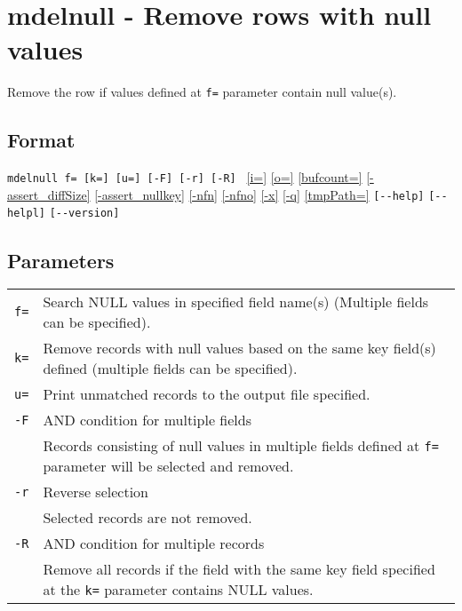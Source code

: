%

\section{mdelnull - Remove rows with null values\label{sect:mdelnull}}
Remove the row if values defined at \verb|f=| parameter contain null value(s). \\

\subsection*{Format}
\verb|mdelnull f= [k=] [u=] [-F] [-r] [-R] | 
\hyperref[sect:option_i]{[i=]}
\hyperref[sect:option_o]{[o=]}
\hyperref[sect:option_bufcount]{[bufcount=]} 
\hyperref[sect:option_assert_diffSize]{[-assert\_diffSize]}
\hyperref[sect:option_assert_nullkey]{[-assert\_nullkey]}
\hyperref[sect:option_nfn]{[-nfn]} 
\hyperref[sect:option_nfno]{[-nfno]}  
\hyperref[sect:option_x]{[-x]}
\hyperref[sect:option_q]{[-q]}
\hyperref[sect:option_option_tmppath]{[tmpPath=]}
\verb|[--help]|
\verb|[--helpl]|
\verb|[--version]|\\

\subsection*{Parameters}
\begin{table}[htbp]
{\small
\begin{tabular}{ll}
\verb|f=|    & Search NULL values in specified field name(s) (Multiple fields can be specified).\\
\verb|k=|    & Remove records with null values based on the same key field(s) defined (multiple fields can be specified). \\ 
\verb|u=|    & Print unmatched records to the output file specified.  \\
\verb|-F|    & AND condition for multiple fields\\
             & Records consisting of null values in multiple fields defined at \verb|f=| parameter will be selected and removed. \\
\verb|-r|    & Reverse selection \\
             & Selected records are not removed. \\
\verb|-R|    & AND condition for multiple records \\
             & Remove all records if the field with the same key field specified at the \verb|k=| parameter contains NULL values. \\
\end{tabular} 
}
\end{table} 


